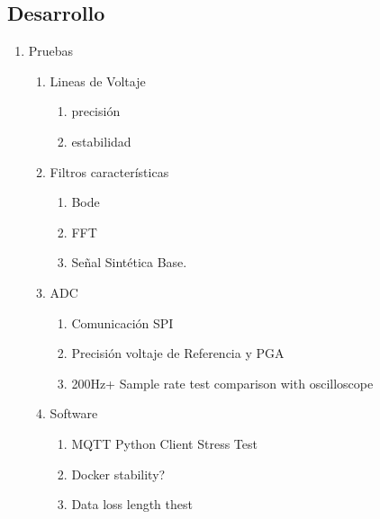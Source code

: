 \documentclass[11pt]{article}
\begin{document}
\subsection{Desarrollo}
\label{sec:org2faf80c}
\begin{enumerate}
\item Pruebas\\
\begin{enumerate}
\item Lineas de Voltaje\\
\begin{enumerate}
\item precisión\\
\item estabilidad\\
\end{enumerate}
\item Filtros características\\
\begin{enumerate}
\item Bode\\
\item FFT\\
\item Señal Sintética Base.\\
\end{enumerate}
\item ADC\\
\begin{enumerate}
\item Comunicación SPI\\
\item Precisión voltaje de Referencia y PGA\\
\item 200Hz+ Sample rate test comparison with oscilloscope\\
\end{enumerate}
\item Software\\
\begin{enumerate}
\item MQTT Python Client Stress Test\\
\item Docker stability?\\
\item Data loss length thest\\
\end{enumerate}
\end{enumerate}
\end{enumerate}
\end{document}
